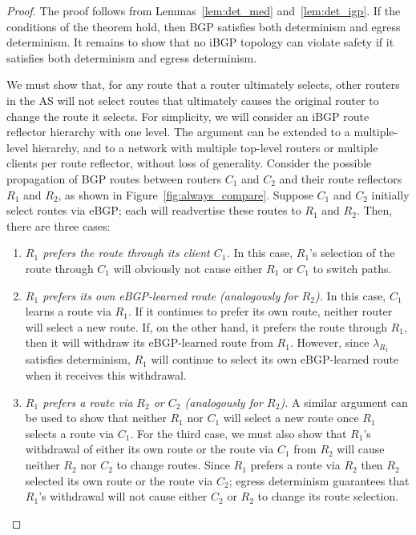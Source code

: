 \begin{proof}
The proof follows from Lemmas~\ref{lem:det_med} and~\ref{lem:det_igp}.
If the conditions of the theorem hold, then BGP satisfies both
determinism and egress determinism.  It remains to show that no iBGP
topology can violate safety if it satisfies both determinism and egress
determinism.  

We must show that, for any route that a router ultimately selects, other
routers in the AS will not select routes that ultimately causes the
original router to change the route it selects.  For simplicity, we will
consider an iBGP route reflector hierarchy with one level.  The argument
can be extended to a multiple-level hierarchy, and to a network with
multiple top-level routers or multiple clients per route reflector,
without loss of generality.  Consider the possible propagation of BGP
routes between routers $C_1$ and $C_2$ and their route reflectors $R_1$
and $R_2$, as shown in Figure~\ref{fig:always_compare}.  Suppose $C_1$
and $C_2$ initially select routes via eBGP; each will readvertise these
routes to $R_1$ and $R_2$.  Then, there are three cases:

\begin{enumerate}
\itemsep=-1pt
\item {\em $R_1$ prefers the route through its client $C_1$.}
In this case, $R_1$'s selection of the route through $C_1$ will
obviously not cause either $R_1$ or $C_1$ to switch paths.  
%
\item {\em $R_1$ prefers its own eBGP-learned route (analogously for
$R_2$).}  In this case, $C_1$ learns a route via $R_1$. If it
continues to prefer its own route, neither router will select a new
route. If, on the other hand, it prefers the route through $R_1$, then
it will withdraw its eBGP-learned route from $R_1$.  However, since
$\lambda_{R_1}$ satisfies determinism, $R_1$ will continue to select its
own eBGP-learned route when it receives this withdrawal.
%
\item {\em $R_1$ prefers a route via $R_2$ or $C_2$ (analogously for
$R_2$).}  A similar argument can be used to show that
neither $R_1$ nor $C_1$ will select a new route once $R_1$ selects a
route via $C_1$.  For the third case, we must also show that $R_1$'s
withdrawal of either its own route or the route via $C_1$ from $R_2$
will cause neither $R_2$ nor $C_2$ to change routes.  Since $R_1$
prefers a route via $R_2$ then $R_2$ selected its own route
or the route via $C_2$; egress determinism guarantees that $R_1$'s
withdrawal will not cause either $C_2$ or $R_2$ to change its route
selection.
\end{enumerate}
\end{proof}

